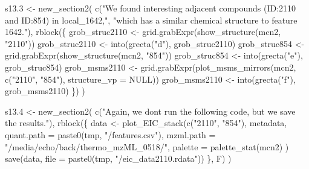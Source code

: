\documentclass[
]{article}
\newenvironment{Shaded}{\begin{snugshade}}{\end{snugshade}}
\newcommand{\AttributeTok}[1]{\textcolor[rgb]{0.77,0.63,0.00}{#1}}
\newcommand{\ConstantTok}[1]{\textcolor[rgb]{0.00,0.00,0.00}{#1}}
\newcommand{\FloatTok}[1]{\textcolor[rgb]{0.00,0.00,0.81}{#1}}
\newcommand{\FunctionTok}[1]{\textcolor[rgb]{0.00,0.00,0.00}{#1}}
\newcommand{\NormalTok}[1]{#1}
\newcommand{\OtherTok}[1]{\textcolor[rgb]{0.56,0.35,0.01}{#1}}
\newcommand{\StringTok}[1]{\textcolor[rgb]{0.31,0.60,0.02}{#1}}
\begin{document}
\begin{Shaded}
\begin{Highlighting}[]
\NormalTok{s13}\FloatTok{.3} \OtherTok{\textless{}{-}} \FunctionTok{new\_section2}\NormalTok{(}
  \FunctionTok{c}\NormalTok{(}\StringTok{"We found interesting adjacent compounds (ID:2110 and ID:854) in \textasciigrave{}local\_1642\textasciigrave{},"}\NormalTok{,}
    \StringTok{"which has a similar chemical structure to \textquotesingle{}feature\textquotesingle{} 1642."}\NormalTok{),}
  \FunctionTok{rblock}\NormalTok{(\{}
\NormalTok{    grob\_struc2110 }\OtherTok{\textless{}{-}} \FunctionTok{grid.grabExpr}\NormalTok{(}\FunctionTok{show\_structure}\NormalTok{(mcn2, }\StringTok{"2110"}\NormalTok{))}
\NormalTok{    grob\_struc2110 }\OtherTok{\textless{}{-}} \FunctionTok{into}\NormalTok{(}\FunctionTok{grecta}\NormalTok{(}\StringTok{"d"}\NormalTok{), grob\_struc2110)}
\NormalTok{    grob\_struc854 }\OtherTok{\textless{}{-}} \FunctionTok{grid.grabExpr}\NormalTok{(}\FunctionTok{show\_structure}\NormalTok{(mcn2, }\StringTok{"854"}\NormalTok{))}
\NormalTok{    grob\_struc854 }\OtherTok{\textless{}{-}} \FunctionTok{into}\NormalTok{(}\FunctionTok{grecta}\NormalTok{(}\StringTok{"e"}\NormalTok{), grob\_struc854)}
\NormalTok{    grob\_msms2110 }\OtherTok{\textless{}{-}} \FunctionTok{grid.grabExpr}\NormalTok{(}\FunctionTok{plot\_msms\_mirrors}\NormalTok{(mcn2, }\FunctionTok{c}\NormalTok{(}\StringTok{"2110"}\NormalTok{, }\StringTok{"854"}\NormalTok{), }\AttributeTok{structure\_vp =} \ConstantTok{NULL}\NormalTok{))}
\NormalTok{    grob\_msms2110 }\OtherTok{\textless{}{-}} \FunctionTok{into}\NormalTok{(}\FunctionTok{grecta}\NormalTok{(}\StringTok{"f"}\NormalTok{), grob\_msms2110)}
\NormalTok{  \})}
\NormalTok{)}

\NormalTok{s13}\FloatTok{.4} \OtherTok{\textless{}{-}} \FunctionTok{new\_section2}\NormalTok{(}
  \FunctionTok{c}\NormalTok{(}\StringTok{"Again, we don\textquotesingle{}t run the following code, but we save the results."}\NormalTok{),}
  \FunctionTok{rblock}\NormalTok{(\{}
\NormalTok{    data }\OtherTok{\textless{}{-}} \FunctionTok{plot\_EIC\_stack}\NormalTok{(}\FunctionTok{c}\NormalTok{(}\StringTok{"2110"}\NormalTok{, }\StringTok{"854"}\NormalTok{), metadata,}
      \AttributeTok{quant.path =} \FunctionTok{paste0}\NormalTok{(tmp, }\StringTok{"/features.csv"}\NormalTok{),}
      \AttributeTok{mzml.path =} \StringTok{"/media/echo/back/thermo\_mzML\_0518/"}\NormalTok{,}
      \AttributeTok{palette =} \FunctionTok{palette\_stat}\NormalTok{(mcn2)}
\NormalTok{    )}
    \FunctionTok{save}\NormalTok{(data, }\AttributeTok{file =} \FunctionTok{paste0}\NormalTok{(tmp, }\StringTok{"/eic\_data2110.rdata"}\NormalTok{))}
\NormalTok{  \}, F)}
\NormalTok{)}


\end{Highlighting}
\end{Shaded}
\end{document}
